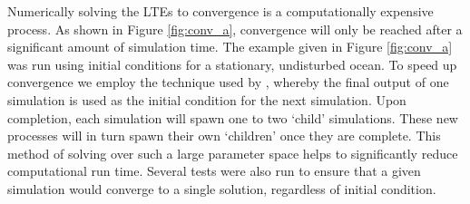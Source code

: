 Numerically solving the LTEs to convergence is a computationally expensive process. As shown in Figure \ref{fig:conv_a}, convergence will only be reached after a significant amount of simulation time. The example given in Figure \ref{fig:conv_a} was run using initial conditions for a stationary, undisturbed ocean. To speed up convergence we employ the technique used by \citet{sears1995tidal}, whereby the final output of one simulation is used as the initial condition for the next simulation. Upon completion, each simulation will spawn one to two `child' simulations. These new processes will in turn spawn their own `children' once they are complete. This method of solving over such a large parameter space helps to significantly reduce computational run time. Several tests were also run to ensure that a given simulation would converge to a single solution, regardless of initial condition.



